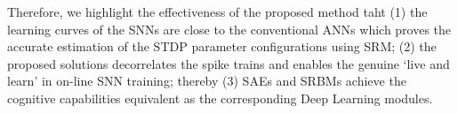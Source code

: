 Therefore, we highlight the effectiveness of the proposed method taht (1) the learning curves of the SNNs are close to the conventional ANNs which proves the accurate estimation of the STDP parameter configurations using SRM; (2) the proposed solutions decorrelates the spike trains and enables the genuine `live and learn' in on-line SNN training; thereby (3) SAEs and SRBMs achieve the cognitive capabilities equivalent as the corresponding Deep Learning modules.
%
%
%

